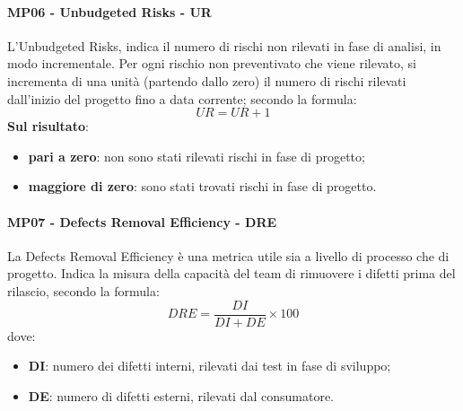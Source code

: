 	 \paragraph{MP06 - Unbudgeted Risks - UR}
	 L'Unbudgeted Risks, indica il numero di rischi non rilevati in fase di analisi, in modo incrementale. Per ogni rischio non preventivato che viene rilevato, si incrementa di una unità (partendo dallo zero) il numero di rischi rilevati dall'inizio del progetto fino a data corrente; secondo la formula:
	 \begin{displaymath}
	 	UR = UR + 1
	 \end{displaymath}
 	{\bfseries Sul risultato}:
 	\begin{itemize}
 		\item {\bfseries pari a zero}: non sono stati rilevati rischi in fase di progetto;
 		\item {\bfseries maggiore di zero}: sono stati trovati rischi in fase di progetto.\\
 	\end{itemize}
	 \paragraph{MP07 - Defects Removal Efficiency - DRE}
	 La Defects Removal Efficiency è una metrica utile sia a livello di processo che di progetto. Indica la misura della capacità del team di rimuovere i difetti prima del rilascio, secondo la formula:
	 \begin{displaymath}
	 DRE = \frac{DI}{DI+DE}\times100
	 \end{displaymath}
 	dove:
 	\begin{itemize}
 		\item {\bfseries DI}: numero dei difetti interni, rilevati dai test in fase di sviluppo;
 		\item {\bfseries DE}: numero di difetti esterni, rilevati dal consumatore.\\

 	\end{itemize}



